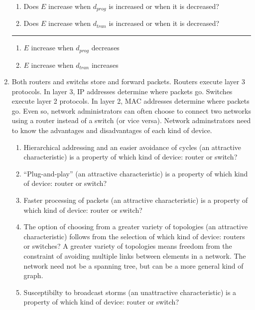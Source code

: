 \documentclass[twoside]{article}
\newenvironment{answer}
  {\vspace*{0.2cm} \rule{12cm}{0.04cm} \vspace*{0.2cm}}
  {\vspace*{0.2cm}}
\begin{document}
\begin{enumerate}
    \begin{enumerate}
      \item Does $E$ increase when $d_{prog}$ is increased or when it is decreased?
      \item Does $E$ increase when $d_{tran}$ is increased or when it is decreased?
      \end{enumerate}

  \begin{answer}

  \begin{enumerate}
    \item $E$ increase when $d_{prog}$ decreases
    \item $E$ increase when $d_{tran}$ increases
    \end{enumerate}

    \end{answer}

  \item Both routers and switchs store and forward packets.
    Routers execute layer 3 protocols. In layer 3, IP addresses determine
    where packets go.
    Switches execute layer 2 protocols. In layer 2, MAC addresses determine
    where packets go.
    Even so, network administrators can often choose to connect two networks
    using a router instead of a switch (or vice versa). 
    Network adminstrators need to know the advantages and disadvantages of
    each kind of device.

  \begin{enumerate}
    \item Hierarchical addressing and an easier avoidance of cycles (an attractive characteristic)
      is a property of which kind of device: router or switch?
    \item ``Plug-and-play'' (an attractive characteristic) is a property of which
      kind of device: router or switch?
    \item Faster processing of packets (an attractive characteristic) is a property
      of which kind of device: router or switch?
    \item The option of choosing from a greater variety of topologies (an attractive characteristic)
      follows from the selection of which kind of device: routers or switches?
      A greater variety of topologies means freedom from the constraint of avoiding multiple links
      between elements in a network. The network need not be a spanning tree, but can be a more
      general kind of graph.
    \item Susceptibilty to broadcast storms (an unattractive characteristic) is a property
      of which kind of device: router or switch?
    \end{enumerate}


\end{enumerate}
\end{document}
